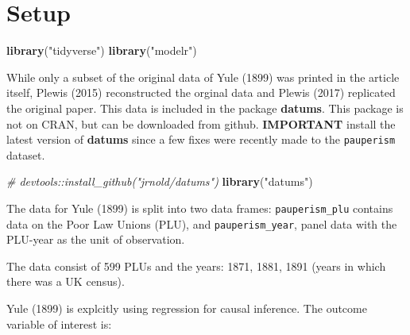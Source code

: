 \documentclass[]{article}
\newenvironment{Shaded}{\begin{snugshade}}{\end{snugshade}}
\newcommand{\KeywordTok}[1]{\textcolor[rgb]{0.13,0.29,0.53}{\textbf{#1}}}
\newcommand{\DataTypeTok}[1]{\textcolor[rgb]{0.13,0.29,0.53}{#1}}
\newcommand{\StringTok}[1]{\textcolor[rgb]{0.31,0.60,0.02}{#1}}
\newcommand{\CommentTok}[1]{\textcolor[rgb]{0.56,0.35,0.01}{\textit{#1}}}
\newcommand{\OperatorTok}[1]{\textcolor[rgb]{0.81,0.36,0.00}{\textbf{#1}}}
\newcommand{\NormalTok}[1]{#1}
\begin{document}
\section{Setup}\label{setup}

\begin{Shaded}
\begin{Highlighting}[]
\KeywordTok{library}\NormalTok{(}\StringTok{"tidyverse"}\NormalTok{)}
\KeywordTok{library}\NormalTok{(}\StringTok{"modelr"}\NormalTok{)}
\end{Highlighting}
\end{Shaded}

While only a subset of the original data of Yule (1899) was printed in
the article itself, Plewis (2015) reconstructed the orginal data and
Plewis (2017) replicated the original paper. This data is included in
the package \textbf{datums}. This package is not on CRAN, but can be
downloaded from github. \textbf{IMPORTANT} install the latest version of
\textbf{datums} since a few fixes were recently made to the
\texttt{pauperism} dataset.

\begin{Shaded}
\begin{Highlighting}[]
\CommentTok{# devtools::install_github("jrnold/datums")}
\KeywordTok{library}\NormalTok{(}\StringTok{"datums"}\NormalTok{)}
\end{Highlighting}
\end{Shaded}

The data for Yule (1899) is split into two data frames:
\texttt{pauperism\_plu} contains data on the Poor Law Unions (PLU), and
\texttt{pauperism\_year}, panel data with the PLU-year as the unit of
observation.

\begin{Shaded}
\end{Shaded}

The data consist of 599 PLUs and the years: 1871, 1881, 1891 (years in
which there was a UK census).

Yule (1899) is explcitly using regression for causal inference. The
outcome variable of interest is:
\end{document}
